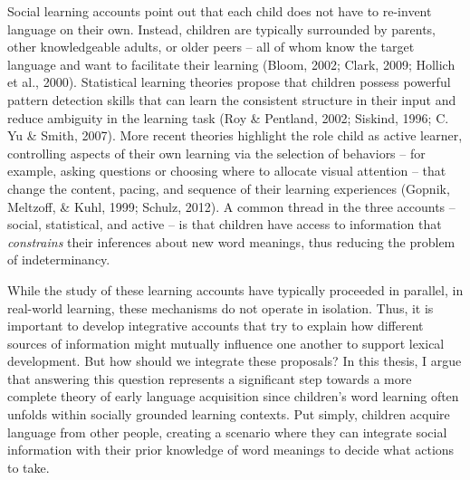 \documentclass[oneside]{report}
\begin{document}
Social learning accounts point out that each child does not have to
re-invent language on their own. Instead, children are typically
surrounded by parents, other knowledgeable adults, or older peers -- all
of whom know the target language and want to facilitate their learning
(Bloom, 2002; Clark, 2009; Hollich et al., 2000). Statistical learning
theories propose that children possess powerful pattern detection skills
that can learn the consistent structure in their input and reduce
ambiguity in the learning task (Roy \& Pentland, 2002; Siskind, 1996; C.
Yu \& Smith, 2007). More recent theories highlight the role child as
active learner, controlling aspects of their own learning via the
selection of behaviors -- for example, asking questions or choosing
where to allocate visual attention -- that change the content, pacing,
and sequence of their learning experiences (Gopnik, Meltzoff, \& Kuhl,
1999; Schulz, 2012). A common thread in the three accounts -- social,
statistical, and active -- is that children have access to information
that \emph{constrains} their inferences about new word meanings, thus
reducing the problem of indeterminancy.

While the study of these learning accounts have typically proceeded in
parallel, in real-world learning, these mechanisms do not operate in
isolation. Thus, it is important to develop integrative accounts that
try to explain how different sources of information might mutually
influence one another to support lexical development. But how should we
integrate these proposals? In this thesis, I argue that answering this
question represents a significant step towards a more complete theory of
early language acquisition since children's word learning often unfolds
within socially grounded learning contexts. Put simply, children acquire
language from other people, creating a scenario where they can integrate
social information with their prior knowledge of word meanings to decide
what actions to take.
\end{document}
